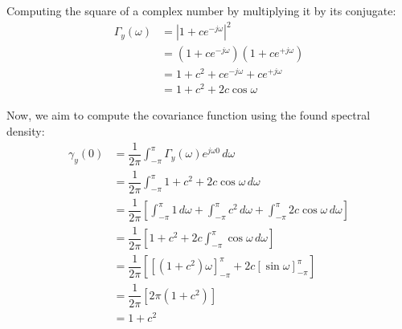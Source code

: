 \begin{example}
    Computing the square of a complex number by multiplying it by its conjugate:
    \begin{align*}
        \Gamma_y(\omega)    &=\left\lvert 1+ce^{-j\omega}\right\rvert^2 \\
                            &=\left(1+ce^{-j\omega}\right)\left(1+ce^{+j\omega}\right) \\
                            &=1+c^2+ce^{-j\omega}+ce^{+j\omega} \\
                            &=1+c^2 + 2c\cos\omega
    \end{align*}

    Now, we aim to compute the covariance function using the found spectral density:
    \begin{align*}
        \gamma_y(0)     &=\dfrac{1}{2\pi}\int_{-\pi}^{\pi}\Gamma_y(\omega)e^{j\omega 0}\,d\omega \\
                        &=\dfrac{1}{2\pi}\int_{-\pi}^{\pi}1+c^2 + 2c\cos\omega\,d\omega \\
                        &=\dfrac{1}{2\pi}\left[\int_{-\pi}^{\pi}1\,d\omega+\int_{-\pi}^{\pi}c^2\,d\omega + \int_{-\pi}^{\pi}2c\cos\omega\,d\omega\right] \\
                        &=\dfrac{1}{2\pi}\left[1+c^2 + 2c\int_{-\pi}^{\pi}\cos\omega\,d\omega\right] \\                     
                        &=\dfrac{1}{2\pi}\left[{\left[\left(1+c^2\right)\omega\right]}_{-\pi}^{\pi} + 2c{\left[\sin\omega\right]}_{-\pi}^{\pi}\right] \\ 
                        &=\dfrac{1}{2\pi}\left[2\pi\left(1+c^2\right)\right] \\       
                        &=1+c^2              
    \end{align*}    
\end{example}
